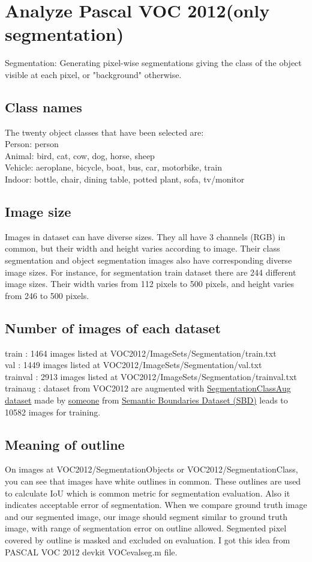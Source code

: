 \documentclass{article}
\begin{document}
\pagestyle{fancy}

\section{Analyze Pascal VOC 2012(only segmentation)}
Segmentation: Generating pixel-wise segmentations giving the class of the object visible at each pixel, or "background" otherwise.
\subsection{Class names}
The twenty object classes that have been selected are:\\
Person: person\\
Animal: bird, cat, cow, dog, horse, sheep\\
Vehicle: aeroplane, bicycle, boat, bus, car, motorbike, train\\
Indoor: bottle, chair, dining table, potted plant, sofa, tv/monitor
\subsection{Image size}
Images in dataset can have diverse sizes. They all have 3 channels (RGB) in common, but their width and height varies according to image. Their class segmentation and object segmentation images also have corresponding diverse image sizes. For instance, for segmentation train dataset there are 244 different image sizes. Their width varies from 112 pixels to 500 pixels, and height varies from 246 to 500 pixels.
\subsection{Number of images of each dataset}
train : 1464 images listed at VOC2012/ImageSets/Segmentation/train.txt\\
val : 1449 images listed at VOC2012/ImageSets/Segmentation/val.txt\\
trainval : 2913 images listed at VOC2012/ImageSets/Segmentation/trainval.txt\\
trainaug : dataset from VOC2012 are augmented with \href{https://www.dropbox.com/s/oeu149j8qtbs1x0/SegmentationClassAug.zip?dl=0}{SegmentationClassAug dataset} made by \href{https://github.com/DrSleep/tensorflow-deeplab-resnet}{someone} from \href{http://home.bharathh.info/pubs/codes/SBD/download.html}{Semantic Boundaries Dataset (SBD)} leads to 10582 images for training.\\
\subsection{Meaning of outline}
On images at VOC2012/SegmentationObjects or VOC2012/SegmentationClass, you can see that images have white outlines in common. These outlines are used to calculate IoU which is common metric for segmentation evaluation. Also it indicates acceptable error of segmentation. When we compare ground truth image and our segmented image, our image should segment similar to ground truth image, with range of segmentation error on outline allowed. Segmented pixel covered by outline is masked and excluded on evaluation. I got this idea from PASCAL VOC 2012 devkit VOCevalseg.m file. \\
\end{document}
